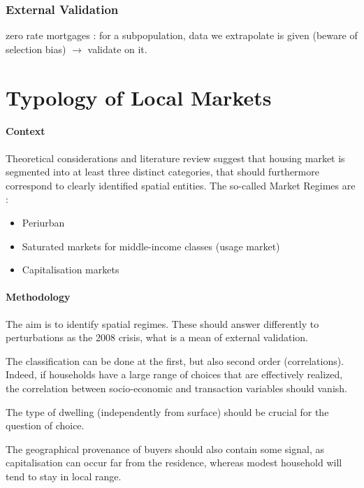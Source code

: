 \subsubsection{External Validation}

zero rate mortgages : for a subpopulation, data we extrapolate is given (beware of selection bias) $\rightarrow$ validate on it.



\section{Typology of Local Markets}


\paragraph{Context}

Theoretical considerations and literature review suggest that housing market is segmented into at least three distinct categories, that should furthermore correspond to clearly identified spatial entities. The so-called Market Regimes are :

\begin{itemize}
\item Periurban
\item Saturated markets for middle-income classes (usage market)
\item Capitalisation markets
\end{itemize}


\paragraph{Methodology}


The aim is to identify spatial regimes. These should answer differently to perturbations as the 2008 crisis, what is a mean of external validation.

The classification can be done at the first, but also second order (correlations). Indeed, if households have a large range of choices that are effectively realized, the correlation between socio-economic and transaction variables should vanish.

The type of dwelling (independently from surface) should be crucial for the question of choice.

The geographical provenance of buyers should also contain some signal, as capitalisation can occur far from the residence, whereas modest household will tend to stay in local range.


